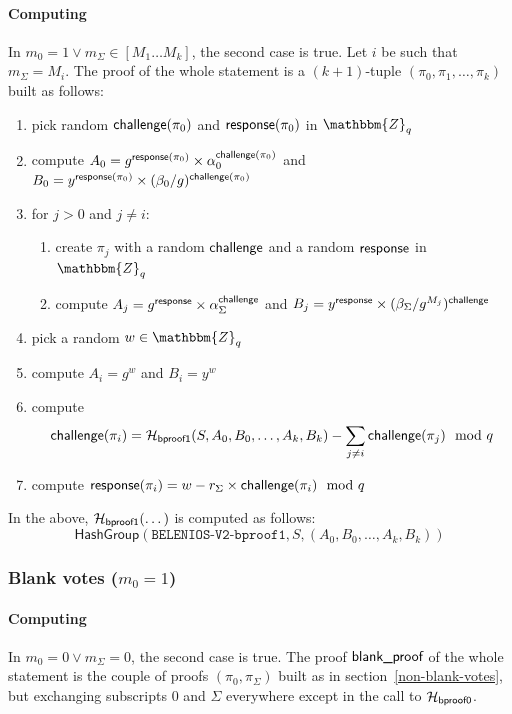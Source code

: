 \documentclass[a4paper]{article}
\newcommand{\dstprefix}{BELENIOS-V2}
\newcommand{\Z}{\mathbbm{Z}}
\begin{document}
\paragraph{Computing \oproof}
In $m_0=1\lor m_\Sigma\in[M_1\dots M_k]$, the second case
is true. Let $i$ be such that $m_\Sigma=M_i$. The proof of the whole
statement is a $(k+1)$-tuple $(\pi_0,\pi_1,\dotsc,\pi_k)$ built as
follows:
\begin{enumerate}
\item pick random $\textsf{challenge}(\pi_0)$ and $\textsf{response}(\pi_0)$
  in $\Z_q$
\item compute
  $A_0=g^{\textsf{response}(\pi_0)}\times\alpha_0^{\textsf{challenge}(\pi_0)}$
  and
  $B_0=y^{\textsf{response}(\pi_0)}\times(\beta_0/g)^{\textsf{challenge}(\pi_0)}$
\item for $j>0$ and $j\neq i$:
  \begin{enumerate}
  \item create $\pi_j$ with a random $\textsf{challenge}$ and a random
    $\textsf{response}$ in $\Z_q$
  \item compute
    $A_j={g^{\textsf{response}}}\times{\alpha_\Sigma^{\textsf{challenge}}}$ and
    $B_j={y^{\textsf{response}}}\times{(\beta_\Sigma/g^{M_j})^{\textsf{challenge}}}$
  \end{enumerate}
\item pick a random $w\in\Z_q$
\item compute $A_i=g^w$ and $B_i=y^w$
\item compute
  \[\textsf{challenge}(\pi_i)=\mathcal{H}_{\textsf{bproof1}}(S,A_0,B_0,\dots,A_k,B_k)-\sum_{j\neq i}\textsf{challenge}(\pi_j)\mod q\]
\item compute $\textsf{response}(\pi_i)=w-r_\Sigma\times\textsf{challenge}(\pi_i)\mod q$
\end{enumerate}
In the above, $\mathcal{H}_{\mathsf{bproof1}}(\dotsc)$ is computed as follows:
\[\textsf{HashGroup}(\texttt{\dstprefix-bproof1},S,(A_0,B_0,\dotsc,A_k,B_k))\]

\subsubsection{Blank votes ($m_0=1$)}

\paragraph{Computing \bproof}
In $m_0=0\lor m_\Sigma=0$, the second case is true. The proof
$\textsf{blank\_proof}$ of the whole statement is the couple of proofs
$(\pi_0,\pi_\Sigma)$ built as in section~\ref{non-blank-votes}, but
exchanging subscripts $0$ and $\Sigma$ everywhere except in the call
to $\mathcal{H}_{\textsf{bproof0}}$.
\end{document}
